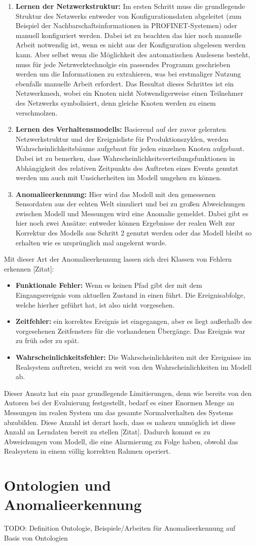 \begin{enumerate}
\item \textbf{Lernen der Netzwerkstruktur:} Im ersten Schritt muss die grundlegende Struktur des Netzwerks entweder von Konfigurationsdaten abgeleitet (zum Beispiel der Nachbarschaftsinformationen in PROFINET-Systemen) oder manuell konfiguriert werden. Dabei ist zu beachten das hier noch manuelle Arbeit notwendig ist, wenn es nicht aus der Konfiguration abgelesen werden kann. Aber selbst wenn die Möglichkeit des automatischen Auslesens besteht, muss für jede Netzwerktechnolgie ein passendes Programm geschrieben werden um die Informationen zu extrahieren, was bei erstmaliger Nutzung ebenfalls manuelle Arbeit erfordert. Das Resultat dieses Schrittes ist ein Netzwerkmesh, wobei ein Knoten nicht Notwendigerweise einen Teilnehmer des Netzwerks symbolisiert, denn gleiche Knoten werden zu einem verschmolzen.
\item \textbf{Lernen des Verhaltensmodells:}  Basierend auf der zuvor gelernten Netzwerkstruktur und der Ereignisliste für Produktionszyklen, werden Wahrscheinlichkeitsbäume aufgebaut für jeden einzelnen Knoten aufgebaut. Dabei ist zu bemerken, dass Wahrscheinlichkeitsverteilungsfunktionen in Abhängigkeit des relativen Zeitpunkts des Auftreten eines Events genutzt werden um auch mit Unsicherheiten im Modell umgehen zu können.
\item \textbf{Anomalieerkennung:} Hier wird das Modell mit den gemessenen Sensordaten aus der echten Welt simuliert und bei zu großen Abweichungen zwischen Modell und Messungen wird eine Anomalie gemeldet. Dabei gibt es hier noch zwei Ansätze: entweder können Ergebnisse der realen Welt zur Korrektur des Modells aus Schritt 2 genutzt werden oder das Modell bleibt so erhalten wie es ursprünglich mal angelernt wurde.
\end{enumerate}
Mit dieser Art der Anomalieerkennung lassen sich drei Klassen von Fehlern erkennen [Zitat]:
\begin{itemize}
\item \textbf{Funktionale Fehler:} Wenn es keinen Pfad gibt der mit dem Eingangsereignis vom aktuellen Zustand in einen führt. Die Ereignisabfolge, welche hierher geführt hat, ist also nicht vorgesehen.
\item \textbf{Zeitfehler:} ein korrektes Ereignis ist eingegangen, aber es liegt außerhalb des vorgesehenen Zeitfensters für die vorhandenen Übergänge. Das Ereignis war zu früh oder zu spät.
\item \textbf{Wahrscheinlichkeitsfehler:}  Die Wahrscheinlichkeiten mit der Ereignisse im Realsystem auftreten, weicht zu weit von den Wahrscheinlichkeiten im Modell ab.
\end{itemize}
Dieser Ansatz hat ein paar grundlegende Limitierungen, denn wie bereits von den Autoren bei der Evaluierung festgestellt, bedarf es einer Enormen Menge an Messungen im realen System um das gesamte Normalverhalten des Systems abzubilden. Diese Anzahl ist derart hoch, dass es nahezu unmöglich ist diese Anzahl an Lerndaten bereit zu stellen [Zitat]. Dadurch kommt es zu Abweichungen vom Modell, die eine Alarmierung zu Folge haben, obwohl das Realsystem in einem völlig korrekten Rahmen operiert.
\section{Ontologien und Anomalieerkennung}
TODO: Definition Ontologie, Beispiele/Arbeiten für Anomalieerkennung auf Basis von Ontologien